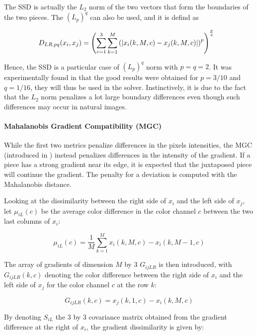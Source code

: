 The SSD is actually the $L_2$ norm of the two vectors that form the boundaries of the two pieces. The $(L_p)^q$ can also be used, and it is defind as

\begin{equation}\label{eq:lpq}
    \hspace{-0.3cm}
    D_{LR,pq}(x_i, x_j) = \left( \sum_{c=1}^{3} \sum_{k=1}^{M} \left( \left| x_i(k,M,c) - x_j(k,M,c)\right|\right)^p \right)^{\frac{p}{q}}
\end{equation}

Hence, the SSD is a particular case of $(L_p)^q$ norm with $p=q=2$. It was experimentally found in \cite{greedy} that the good results were obtained for $p=3/10$ and $q=1/16$, they will thus be used in the solver. Instinctively, it is due to the fact that the $L_2$ norm penalizes a lot large boundary differences even though such differences may occur in natural images. 

\paragraph{Mahalanobis Gradient Compatibility (MGC)}

While the first two metrics penalize differences in the pixels intensities, the MGC (introduced in \cite{Gallagher}) instead penalizes differences in the intensity of the gradient. If a piece has a strong gradient near its edge, it is expected that the juxtaposed piece will continue the gradient. The penalty for a deviation is computed with the Mahalanobis distance.

Looking at the dissimilarity between the right side of $x_i$ and the left side of $x_j$, let $\mu_{iL}(c)$ be the average color difference in the color channel $c$ between the two last columns of $x_i$:

\begin{equation}
    \mu_{iL}(c) = \frac{1}{M} \sum_{k=1}^{M} x_i(k,M,c) - x_i(k,M-1,c) 
\end{equation}

The array of gradients of dimension $M$ by 3 $G_{ijLR}$ is then introduced, with $G_{ijLR}(k,c)$ denoting the color difference between the right side of $x_i$ and the left side of $x_j$ for the color channel $c$ at the row $k$:

\begin{equation}
    G_{ijLR}(k,c) = x_j(k,1,c) - x_i(k,M,c) 
\end{equation}

By denoting $S_{iL}$ the 3 by 3 covariance matrix obtained from the gradient difference at the right of $x_i$, the gradient dissimilarity is given by:

